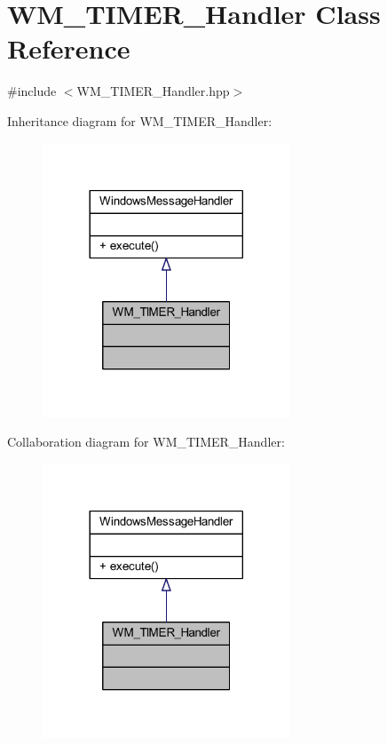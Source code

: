 \hypertarget{class_w_m___t_i_m_e_r___handler}{}\section{W\+M\+\_\+\+T\+I\+M\+E\+R\+\_\+\+Handler Class Reference}
\label{class_w_m___t_i_m_e_r___handler}


{\ttfamily \#include $<$W\+M\+\_\+\+T\+I\+M\+E\+R\+\_\+\+Handler.\+hpp$>$}



Inheritance diagram for W\+M\+\_\+\+T\+I\+M\+E\+R\+\_\+\+Handler\+:\nopagebreak
\begin{figure}[H]
\begin{center}
\leavevmode
\includegraphics[width=209pt]{class_w_m___t_i_m_e_r___handler__inherit__graph}
\end{center}
\end{figure}


Collaboration diagram for W\+M\+\_\+\+T\+I\+M\+E\+R\+\_\+\+Handler\+:\nopagebreak
\begin{figure}[H]
\begin{center}
\leavevmode
\includegraphics[width=209pt]{class_w_m___t_i_m_e_r___handler__coll__graph}
\end{center}
\end{figure}
